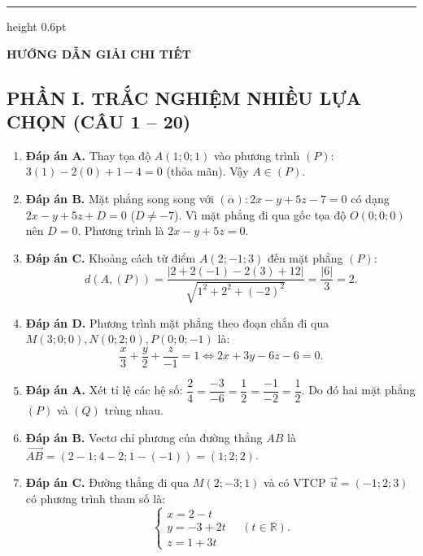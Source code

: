 \documentclass[12pt,a4paper]{article}
\begin{document}
\vspace{8pt}
\hrule height 0.6pt
\vspace{8pt}

\begin{center}
    {\fontsize{13}{15}\selectfont\textbf{HƯỚNG DẪN GIẢI CHI TIẾT}}
\end{center}

\subsection*{PHẦN I. TRẮC NGHIỆM NHIỀU LỰA CHỌN (CÂU 1 -- 20)}

\begin{enumerate}
\item \textbf{Đáp án A.}  
Thay tọa độ $A(1; 0; 1)$ vào phương trình $(P)$: $3(1) - 2(0) + 1 - 4 = 0$ (thỏa mãn). Vậy $A \in (P)$.

\item \textbf{Đáp án B.}  
Mặt phẳng song song với $(\alpha): 2x - y + 5z - 7 = 0$ có dạng $2x - y + 5z + D = 0$ ($D \ne -7$).  
Vì mặt phẳng đi qua gốc tọa độ $O(0; 0; 0)$ nên $D = 0$. Phương trình là $2x - y + 5z = 0$.

\item \textbf{Đáp án C.}  
Khoảng cách từ điểm $A(2; -1; 3)$ đến mặt phẳng $(P)$:
\[
d(A, (P)) = \dfrac{|2 + 2(-1) - 2(3) + 12|}{\sqrt{1^2 + 2^2 + (-2)^2}} = \dfrac{|6|}{3} = 2.
\]

\item \textbf{Đáp án D.}  
Phương trình mặt phẳng theo đoạn chắn đi qua $M(3; 0; 0), N(0; 2; 0), P(0; 0; -1)$ là:
\[
\dfrac{x}{3} + \dfrac{y}{2} + \dfrac{z}{-1} = 1 \iff 2x + 3y - 6z - 6 = 0.
\]

\item \textbf{Đáp án A.}  
Xét tỉ lệ các hệ số: $\dfrac{2}{4} = \dfrac{-3}{-6} = \dfrac{1}{2} = \dfrac{-1}{-2} = \dfrac{1}{2}$.  
Do đó hai mặt phẳng $(P)$ và $(Q)$ trùng nhau.

\item \textbf{Đáp án B.}  
Vectơ chỉ phương của đường thẳng $AB$ là $\vec{AB} = (2 - 1; 4 - 2; 1 - (-1)) = (1; 2; 2)$.

\item \textbf{Đáp án C.}  
Đường thẳng đi qua $M(2; -3; 1)$ và có VTCP $\vec{u} = (-1; 2; 3)$ có phương trình tham số là:
\[
\begin{cases} x = 2 - t \\ y = -3 + 2t \\ z = 1 + 3t \end{cases}\quad (t \in \mathbb{R}).
\]


\end{enumerate}
\end{document}

